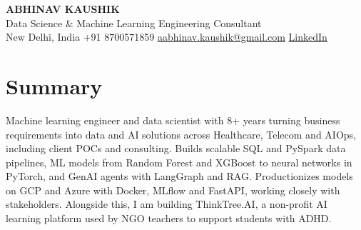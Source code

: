 \documentclass[10pt,a4paper]{article}
\begin{document}
\begin{center}
  {\LARGE\bfseries ABHINAV KAUSHIK}\\[2pt]
  {\large Data Science \& Machine Learning Engineering Consultant}\\[2pt]
  New Delhi, India \textbar{} +91 8700571859 \textbar{} \href{mailto:aabhinav.kaushik@gmail.com}{aabhinav.kaushik@gmail.com} \textbar{} \href{https://www.linkedin.com/in/abhinav-kaushik10/}{LinkedIn}  
\end{center}

\section{Summary}
Machine learning engineer and data scientist with 8+ years turning business requirements into data and AI solutions across Healthcare, Telecom and AIOps, including client POCs and consulting. Builds scalable SQL and PySpark data pipelines, ML models from Random Forest and XGBoost to neural networks in PyTorch, and GenAI agents with LangGraph and RAG. Productionizes models on GCP and Azure with Docker, MLflow and FastAPI, working closely with stakeholders. Alongside this, I am building ThinkTree.AI, a non-profit AI learning platform used by NGO teachers to support students with ADHD.
\end{document}
